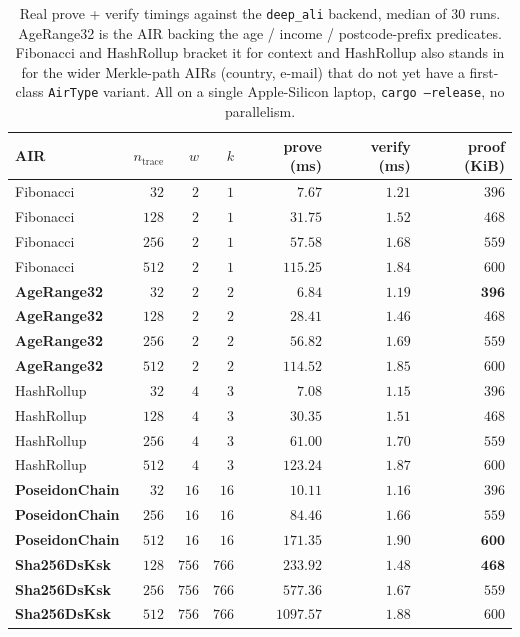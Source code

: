 \documentclass[11pt,a4paper]{article}
\begin{document}
\begin{table}[h]
  \centering
  \caption{Real prove + verify timings against the
    \texttt{deep\_ali} backend, median of $30$ runs.  AgeRange32
    is the AIR backing the age / income / postcode\nobreakdash-prefix
    predicates.  Fibonacci and HashRollup bracket it for context
    and HashRollup also stands in for the wider Merkle\nobreakdash-path
    AIRs (country, e\nobreakdash-mail) that do not yet have a
    first\nobreakdash-class \texttt{AirType} variant.  All on a
    single Apple\nobreakdash-Silicon laptop, \texttt{cargo --release},
    no parallelism.}
  \label{tab:compute}
  \begin{tabular}{l r r r r r r}
    \toprule
    \textbf{AIR} & $n_\mathrm{trace}$ & $w$ & $k$ &
      \textbf{prove (ms)} & \textbf{verify (ms)} & \textbf{proof (KiB)} \\
    \midrule
    Fibonacci    &   $32$ & $2$ & $1$ &   $7.67$ & $1.21$ & $396$ \\
    Fibonacci    &  $128$ & $2$ & $1$ &  $31.75$ & $1.52$ & $468$ \\
    Fibonacci    &  $256$ & $2$ & $1$ &  $57.58$ & $1.68$ & $559$ \\
    Fibonacci    &  $512$ & $2$ & $1$ & $115.25$ & $1.84$ & $600$ \\
    \midrule
    \textbf{AgeRange32} &   $32$ & $2$ & $2$ & $\mathbf{6.84}$ & $\mathbf{1.19}$ & $\mathbf{396}$ \\
    \textbf{AgeRange32} &  $128$ & $2$ & $2$ &  $28.41$ & $1.46$ & $468$ \\
    \textbf{AgeRange32} &  $256$ & $2$ & $2$ &  $56.82$ & $1.69$ & $559$ \\
    \textbf{AgeRange32} &  $512$ & $2$ & $2$ & $114.52$ & $1.85$ & $600$ \\
    \midrule
    HashRollup   &   $32$ & $4$ & $3$ &   $7.08$ & $1.15$ & $396$ \\
    HashRollup   &  $128$ & $4$ & $3$ &  $30.35$ & $1.51$ & $468$ \\
    HashRollup   &  $256$ & $4$ & $3$ &  $61.00$ & $1.70$ & $559$ \\
    HashRollup   &  $512$ & $4$ & $3$ & $123.24$ & $1.87$ & $600$ \\
    \midrule
    \textbf{PoseidonChain} &   $32$ & $16$ & $16$ &  $\phantom{0}10.11$ & $1.16$ & $396$ \\
    \textbf{PoseidonChain} &  $256$ & $16$ & $16$ &  $\phantom{0}84.46$ & $1.66$ & $559$ \\
    \textbf{PoseidonChain} &  $512$ & $16$ & $16$ &           $\mathbf{171.35}$ & $\mathbf{1.90}$ & $\mathbf{600}$ \\
    \midrule
    \textbf{Sha256DsKsk} &  $128$ & $756$ & $766$ &  $\mathbf{233.92}$ & $\mathbf{1.48}$ & $\mathbf{468}$ \\
    \textbf{Sha256DsKsk} &  $256$ & $756$ & $766$ &  $577.36$ & $1.67$ & $559$ \\
    \textbf{Sha256DsKsk} &  $512$ & $756$ & $766$ & $1097.57$ & $1.88$ & $600$ \\
    \bottomrule
  \end{tabular}
\end{table}
\end{document}
